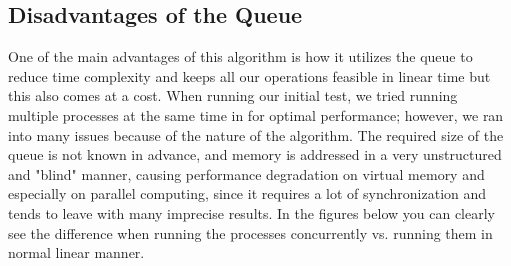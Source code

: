 \documentclass{article}
\begin{document}
\subsection{Disadvantages of the Queue}
\begin{flushleft}
One of the main advantages of this algorithm is how it utilizes the queue to reduce time complexity and keeps all our operations feasible in linear time but this also comes at a cost. When running our initial test, we tried running multiple processes at the same time in for optimal performance; however, we ran into many issues because of the nature of the algorithm. The required size of the queue is not known in advance, and memory is addressed in a very unstructured and "blind" manner, causing performance degradation on
virtual memory and especially on parallel computing, since it requires a lot of synchronization and tends to leave with many imprecise results. In the figures below you can clearly see the difference when running the processes concurrently vs. running them in normal linear manner.
\end{flushleft}
\end{document}
